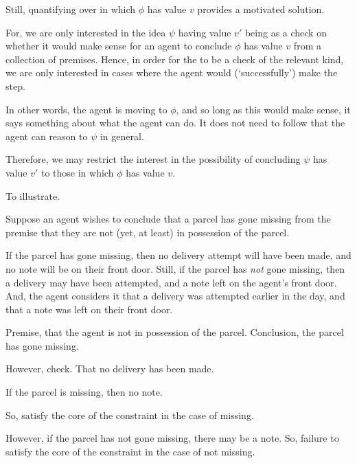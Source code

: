 \begin{note}[Solution]
  \color{red}
  Still, quantifying over  in which \(\phi\) has value \(v\) provides a motivated solution.

  For, we are only interested in the idea \(\psi\) having value \(v'\) being \crequ{} as a check on whether it would make sense for an agent to conclude \(\phi\) has value \(v\) from a collection of premises.
  Hence, in order for the \crequ{} to be a check of the relevant kind, we are only interested in cases where the agent would (`successfully') make the step.

  In other words, the agent is moving to \(\phi\), and so long as this would make sense, it says something about what the agent can do.
  It does not need to follow that the agent can reason to \(\psi\) in general.

  Therefore, we may restrict the interest in the possibility of concluding \(\psi\) has value \(v'\) to those  in which \(\phi\) has value \(v\).
\end{note}

\begin{note}[Illustration]
  To illustrate.

  \begin{illustration}
    Suppose an agent wishes to conclude that a parcel has gone missing from the premise that they are not (yet, at least) in possession of the parcel.

    If the parcel has gone missing, then no delivery attempt will have been made, and no note will be on their front door.
    Still, if the parcel has \emph{not} gone missing, then a delivery may have been attempted, and a note left on the agent's front door.
    And, the agent considers it \epVAd{} that a delivery was attempted earlier in the day, and that a note was left on their front door.
  \end{illustration}

  Premise, that the agent is not in possession of the parcel.
  Conclusion, the parcel has gone missing.

  However, check.
  That no delivery has been made.

  If the parcel is missing, then no note.

  So, satisfy the core of the constraint in the case of missing.

  However, if the parcel has not gone missing, there may be a note.
  So, failure to satisfy the core of the constraint in the case of not missing.
\end{note}

